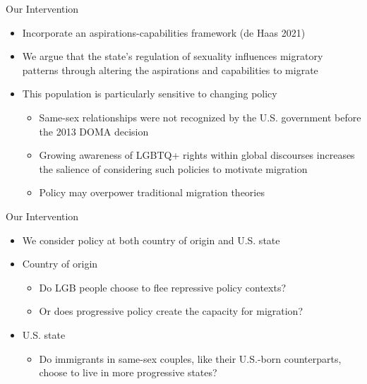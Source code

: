 \documentclass[
  ignorenonframetext,
]{beamer}
\providecommand{\tightlist}{%
  \setlength{\itemsep}{0pt}\setlength{\parskip}{0pt}}
\begin{document}
\begin{frame}{Our Intervention}
\protect\hypertarget{our-intervention}{}
\begin{itemize}
\tightlist
\item
  Incorporate an aspirations-capabilities framework (de Haas 2021)
\item
  We argue that the state's regulation of sexuality influences migratory
  patterns through altering the aspirations and capabilities to migrate
\item
  This population is particularly sensitive to changing policy

  \begin{itemize}
  \tightlist
  \item
    Same-sex relationships were not recognized by the U.S. government
    before the 2013 DOMA decision
  \item
    Growing awareness of LGBTQ+ rights within global discourses
    increases the salience of considering such policies to motivate
    migration
  \item
    Policy may overpower traditional migration theories
  \end{itemize}
\end{itemize}
\end{frame}

\begin{frame}{Our Intervention}
\protect\hypertarget{our-intervention-1}{}
\begin{itemize}
\tightlist
\item
  We consider policy at both country of origin and U.S. state
\item
  Country of origin

  \begin{itemize}
  \tightlist
  \item
    Do LGB people choose to flee repressive policy contexts?
  \item
    Or does progressive policy create the capacity for migration?
  \end{itemize}
\item
  U.S. state

  \begin{itemize}
  \tightlist
  \item
    Do immigrants in same-sex couples, like their U.S.-born
    counterparts, choose to live in more progressive states?
  \end{itemize}
\end{itemize}
\end{frame}
\end{document}
